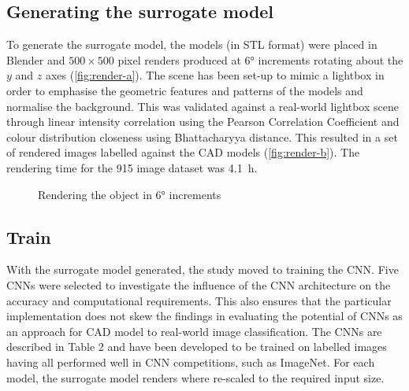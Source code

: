 \documentclass[a4paper, 11pt]{article}
\begin{document}
\subsection{Generating the surrogate model}

To generate the surrogate model, the models (in STL format) were placed in Blender and $500 \times 500$ pixel renders produced at \ang{6} increments rotating about the $y$ and $z$ axes (\cref{fig:render-a}). The scene has been set-up to mimic a lightbox in order to emphasise the geometric features and patterns of the models and normalise the background. This was validated against a real-world lightbox scene through linear intensity correlation using the Pearson Correlation Coefficient and colour distribution closeness using Bhattacharyya distance. This resulted in a set of rendered images labelled against the CAD models (\cref{fig:render-b}). The rendering time for the 915 image dataset was \SI{4.1}{\hour}.

\begin{figure}[t!]

    \hfill{}
    \hfill{}
    \hfill{}
    \caption{Rendering the object in \ang{6} increments}\label{fig:render-points}
\end{figure}

\subsection{Train}

With the surrogate model generated, the study moved to training the CNN.
Five CNNs were selected to investigate the influence of the CNN architecture on the accuracy and computational requirements.
This also ensures that the particular implementation does not skew the findings in evaluating the potential of CNNs as an approach for CAD model to real-world image classification.
The CNNs are described in Table 2 and have been developed to be trained on labelled images having all performed well in CNN competitions, such as ImageNet.
For each model, the surrogate model renders where re-scaled to the required input size.
\end{document}
